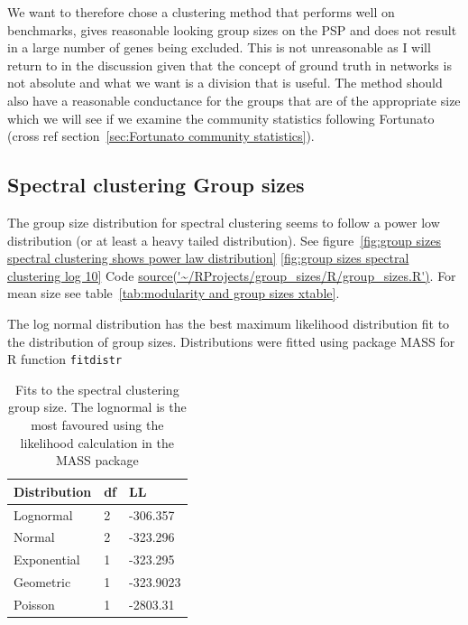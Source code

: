  




We want to therefore chose a clustering method that performs well on benchmarks, gives reasonable looking group sizes on the PSP and does not result in a large number of genes being excluded. This is not unreasonable as I will return to in the discussion given that the concept of ground truth in networks is not absolute and what we want is a division that is useful. The method should also have a reasonable conductance for the groups that are of the appropriate size which we will see if we examine the community statistics following Fortunato (cross ref section~\ref{sec:Fortunato community statistics}). 
\subsection{Spectral clustering Group sizes}


The group size distribution for spectral clustering seems to follow a power low distribution (or at least a heavy tailed distribution). See figure~\ref{fig:group sizes spectral clustering shows power law distribution} \ref{fig:group sizes spectral clustering log 10} Code \url{source('~/RProjects/group_sizes/R/group_sizes.R')}. For mean size see table~\ref{tab:modularity and group sizes xtable}. 

The log normal distribution has the best maximum likelihood distribution fit to the distribution of group sizes. Distributions were fitted using package MASS  \cite{venables2002mass} for R function \texttt{fitdistr}

\begin{table}[]
    \centering
    \begin{tabular}{lll}
    \toprule
    Distribution     & df & LL  \\
    \midrule
    Lognormal     & 2 &-306.357\\
    Normal      & 2 & -323.296\\
    Exponential & 1 & -323.295\\
    Geometric & 1 & -323.9023\\
    Poisson & 1 & -2803.31\\
    \bottomrule
    \end{tabular}
    \caption{Fits to the spectral clustering group size. The lognormal is the most favoured using the likelihood calculation in the MASS package}
    \label{tab:LL spectral clustering group sizes}
\end{table}


